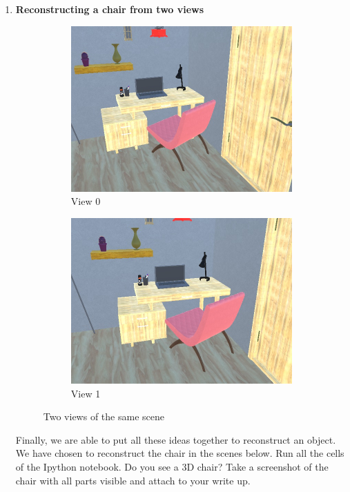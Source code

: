 \begin{enumerate}
\item{\textbf{Reconstructing a chair from two views}}
    \begin{figure}[!h]
    \centering
    \begin{subfigure}{.5\textwidth}
      \centering
      \includegraphics[width=\linewidth]{figures/view_0.jpg}
      \caption{View 0}
      \label{fig:sub1}
    \end{subfigure}%
    \begin{subfigure}{.5\textwidth}
      \centering
      \includegraphics[width=\linewidth]{figures/view_1.jpg}
      \caption{View 1}
      \label{fig:sub2}
    \end{subfigure}
    \caption{Two views of the same scene}
    \end{figure}
    \newline
    \newline
    Finally, we are able to put all these ideas together to reconstruct an object. We have chosen to reconstruct the chair in the scenes below. Run all the cells of the Ipython notebook. Do you see a 3D chair? Take a screenshot  of the chair with all parts visible and attach to your write up.
    
    \sol{}
\end{enumerate}
